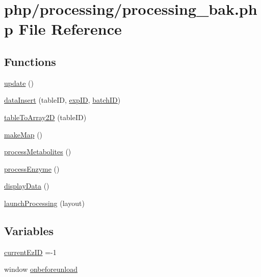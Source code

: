 \hypertarget{processing__bak_8php}{\section{php/processing/processing\-\_\-bak.php File Reference}
\label{processing__bak_8php}
}
\subsection*{Functions}
\begin{DoxyCompactItemize}
\item 
\hyperlink{processing__bak_8php_a842e4774e3b3601a005b995c02f7e883}{update} ()
\item 
\hyperlink{processing__bak_8php_a89da1e95057c1fbc88b341bca8f9e045}{data\-Insert} (table\-I\-D, \hyperlink{admin_rawdata_8php_a888d53a6517f4272b5982c3ca9d16e8a}{exp\-I\-D}, \hyperlink{obsolete_2processing__bak_8php_a88c5bc4262b7c34f236357f5c53fc99b}{batch\-I\-D})
\item 
\hyperlink{processing__bak_8php_afb304d762110b44295d7a6276258371e}{table\-To\-Array2\-D} (table\-I\-D)
\item 
\hyperlink{processing__bak_8php_aa5611b9056cce4a61fe798b64bed77a8}{make\-Map} ()
\item 
\hyperlink{processing__bak_8php_a47de9698475b6df6d67de31018af835e}{process\-Metabolites} ()
\item 
\hyperlink{processing__bak_8php_a7d55c50976945779a4db3f8fa38c1a83}{process\-Enzyme} ()
\item 
\hyperlink{processing__bak_8php_a0ad1822364312d61095a470b8ca3639b}{display\-Data} ()
\item 
\hyperlink{processing__bak_8php_a1712a87d461ae7a47d0e803ac67965ce}{launch\-Processing} (layout)
\end{DoxyCompactItemize}
\subsection*{Variables}
\begin{DoxyCompactItemize}
\item 
\hyperlink{processing__bak_8php_aa7b648ce9374344019d30469fd37c30e}{current\-Ez\-I\-D} =-\/1
\item 
window \hyperlink{processing__bak_8php_a12dd03abd8fa9daa2fe8eaeb9c9682c3}{onbeforeunload}
\end{DoxyCompactItemize}


